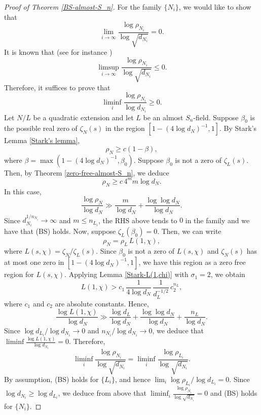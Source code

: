 \documentclass[12pt]{amsart}
\theoremstyle{definition}
\begin{document}
\begin{proof}[Proof of Theorem \ref{BS-almost-S_n}]
For the family $\{N_i\}$, we would like to show that
$$
    \lim_{i\to\infty} \frac{\log \rho_{N_i}}{\log \sqrt{d_{N_i}}} = 0.
$$
It is known that (see for instance \cite[Chapter XVI, Lemma 1]{lang})
$$
    \limsup_{i\to\infty} \frac{\log \rho_{N_i}}{\log \sqrt{d_{N_i}}} \leq 0.
$$
Therefore, it suffices to prove that
$$
    \liminf_{i} \frac{\log \rho_{N_i}}{\log d_{N_i}} \geq 0.
$$
Let $N/L$ be a quadratic extension and let $L$ be an almost $S_n$-field. Suppose $\beta_0$ is the possible real zero of $\zeta_N(s)$ in the region $[1-(4\log d_N)^{-1},1]$. By Stark's Lemma \ref{Stark's lemma},
$$
    \rho_N \geq c(1-\beta),
$$
where $\beta=\max (1-(4\log d_N)^{-1}, \beta_0)$. Suppose $\beta_0$ is not a zero of $\zeta_L(s)$. Then, by Theorem \ref{zero-free-almost-S_n}, we deduce
$$
    \rho_N \geq c\, 4^{m} m \log d_N.
$$
In this case,
$$
    \frac{\log \rho_N}{\log d_N} \gg \frac{m}{\log d_N} + \frac{\log\log d_N}{\log d_N}.
$$
Since $d_{N_i}^{1/n_{N_i}} \to\infty$ and $m\leq n_{L_i}$, the RHS above tends to $0$ in the family and we have that (BS) holds. Now, suppose $\zeta_L(\beta_0)=0$. Then, we can write
\begin{equation*}
    \rho_N = \rho_L \, L(1,\chi),
\end{equation*}
where $L(s,\chi) = \zeta_N/\zeta_L(s)$. Since $\beta_0$ is not a zero of $L(s,\chi)$ and $\zeta_N(s)$ has at most one zero in $[1-(4\log d_N)^{-1}, 1]$, we have this region as a zero free region for $L(s,\chi)$. Applying Lemma \ref{Stark-L(1,chi)} with $\sigma_1=2$, we obtain 
\begin{equation*}
    L(1,\chi) > c_1 \, \frac{1}{4\log d_N} \, \frac{1}{d_L^{-1/2}}\, c_2^{n_L}, 
\end{equation*}
where $c_1$ and $c_2$ are absolute constants. Hence, 
\begin{equation*}
    \frac{\log L(1,\chi)}{\log d_N} \gg \frac{\log d_L}{\log d_N} + \frac{\log\log d_N}{\log d_N} + \frac{n_L}{\log d_N}.
\end{equation*}
Since $\log d_{L_i}/\log d_{N_i} \to 0$ and $n_{N_i}/{\log d_{N_i}} \to 0$, we deduce that $\liminf \frac{\log L(1,\chi)}{\log d_{N_i}} =0$. Therefore,
\begin{equation*}
    \liminf_i \frac{\log \rho_{N_i}}{\log \sqrt{d_{N_i}}} = \liminf_i \frac{\log \rho_{L_i}}{\log \sqrt{d_{N_i}}}.
\end{equation*}
By assumption, (BS) holds for $\{L_i\}$, and hence $\lim_i \log \rho_{L_i}/\log d_{L_i} = 0$. Since $\log d_{N_i}\geq \log d_{L_i}$, we deduce from above that $\liminf_i \frac{\log \rho_{N_i}}{\log \sqrt{d_{N_i}}} =0$ and (BS) holds for $\{N_i\}$.


\end{proof}
\end{document}
